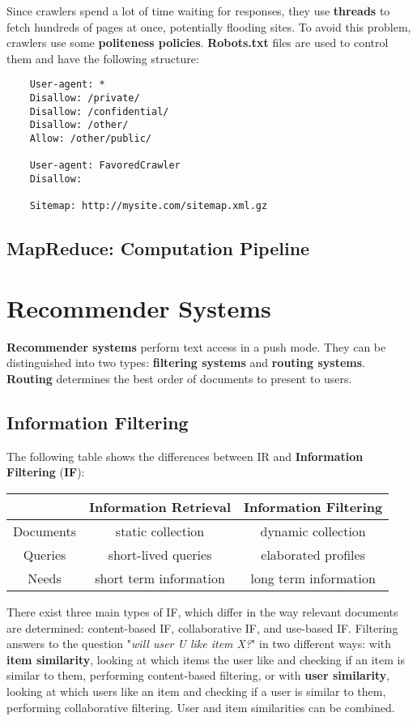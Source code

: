 \documentclass{article}
\begin{document}
Since crawlers spend a lot of time waiting for responses, they use \textbf{threads} to fetch hundreds of pages at once, potentially flooding sites. To avoid this problem, crawlers use some \textbf{politeness policies}. \textbf{Robots.txt} files are used to control them and have the following structure:
\begin{verbatim}
    User-agent: *
    Disallow: /private/
    Disallow: /confidential/
    Disallow: /other/
    Allow: /other/public/
    
    User-agent: FavoredCrawler
    Disallow:
    
    Sitemap: http://mysite.com/sitemap.xml.gz
\end{verbatim}

\subsection{MapReduce: Computation Pipeline}



\newpage

\section{Recommender Systems}
\textbf{Recommender systems} perform text access in a push mode. They can be distinguished into two types: \textbf{filtering systems} and \textbf{routing systems}. \textbf{Routing} determines the best order of documents to present to users.

\subsection{Information Filtering}
The following table shows the differences between IR and \textbf{Information Filtering} (\textbf{IF}):
\begin{table}[]
    \begin{tabular}{c|c|c}
                  & Information Retrieval  & Information Filtering \\ \hline
        Documents & static collection      & dynamic collection    \\ \hline
        Queries   & short-lived queries    & elaborated profiles   \\ \hline
        Needs     & short term information & long term information
    \end{tabular}
\end{table}
There exist three main types of IF, which differ in the way relevant documents are determined: content-based IF, collaborative IF, and use-based IF.
Filtering answers to the question "\textit{will user U like item X?}" in two different ways: with \textbf{item similarity}, looking at which items the user like and checking if an item is similar to them, performing content-based filtering, or with \textbf{user similarity}, looking at which users like an item and checking if a user is similar to them, performing collaborative filtering. User and item similarities can be combined.
\end{document}

